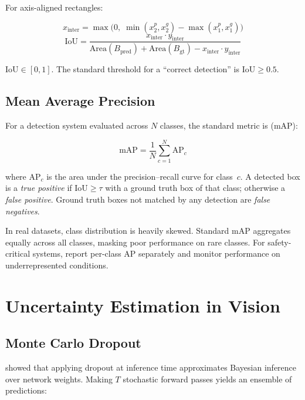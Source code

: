 For axis-aligned rectangles:

\[
x_\text{inter} = \max\bigl(0,\; \min(x_2^p, x_2^g) - \max(x_1^p, x_1^g)\bigr)
\]
\[
\text{IoU} = \frac{x_\text{inter} \cdot y_\text{inter}}
                  {\text{Area}(B_\text{pred}) + \text{Area}(B_\text{gt}) - x_\text{inter} \cdot y_\text{inter}}
\]

$\text{IoU} \in [0,1]$. The standard threshold for a ``correct detection'' is $\text{IoU} \geq 0.5$.

\subsection{Mean Average Precision}

For a detection system evaluated across $N$ classes, the standard metric is  (mAP):

\[
\text{mAP} = \frac{1}{N} \sum_{c=1}^{N} \text{AP}_c
\]

where $\text{AP}_c$ is the area under the precision--recall curve for class~$c$. A detected box is a \emph{true positive} if $\text{IoU} \geq \tau$ with a ground truth box of that class; otherwise a \emph{false positive}. Ground truth boxes not matched by any detection are \emph{false negatives}.

\begin{cautionbox}
In real datasets, class distribution is heavily skewed. Standard mAP aggregates equally across all classes, masking poor performance on rare classes. For safety-critical systems, report per-class AP separately and monitor performance on underrepresented conditions.
\end{cautionbox}

\section{Uncertainty Estimation in Vision}

\subsection{Monte Carlo Dropout}

\textcite{gal2016dropout} showed that applying dropout at inference time approximates Bayesian inference over network weights. Making $T$ stochastic forward passes yields an ensemble of predictions:

